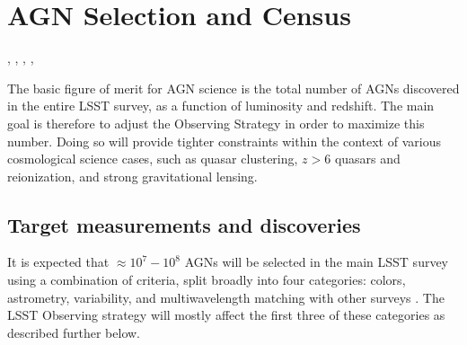 %
%

\section{AGN Selection and Census}\label{sec:AGNCensus}
\def\secname{\chpname:census}\label{sec:\secname}

,
,
,
,

The basic figure of merit for AGN science is the total number of AGNs
discovered in the entire LSST survey, as a function of luminosity and
redshift. The main goal is therefore to adjust the Observing Strategy
in order to maximize this number.
Doing so will provide tighter constraints within the context
of various cosmological science cases, such as quasar clustering,
$z>6$ quasars and reionization, and strong gravitational lensing.


\subsection{Target measurements and discoveries}
\label{sec:\secname:targets}

It is expected that $\approx 10^7 - 10^8$ AGNs will be selected in the
main LSST survey using a combination of criteria, split broadly into
four categories: colors, astrometry, variability, and multiwavelength
matching with other surveys \citep{2009arXiv0912.0201L, 2013AAS...22124710S}.
The LSST Observing strategy will mostly affect the first three of these
categories as described further below.

